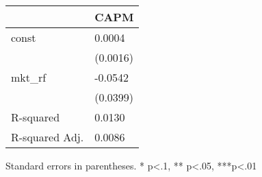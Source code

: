 \begin{table}
\caption{}
\label{}
\begin{center}
\begin{tabular}{ll}
\hline
               & CAPM      \\
\hline
const          & 0.0004    \\
               & (0.0016)  \\
mkt\_rf        & -0.0542   \\
               & (0.0399)  \\
R-squared      & 0.0130    \\
R-squared Adj. & 0.0086    \\
\hline
\end{tabular}
\end{center}
\end{table}
\bigskip
Standard errors in parentheses. \newline 
* p<.1, ** p<.05, ***p<.01